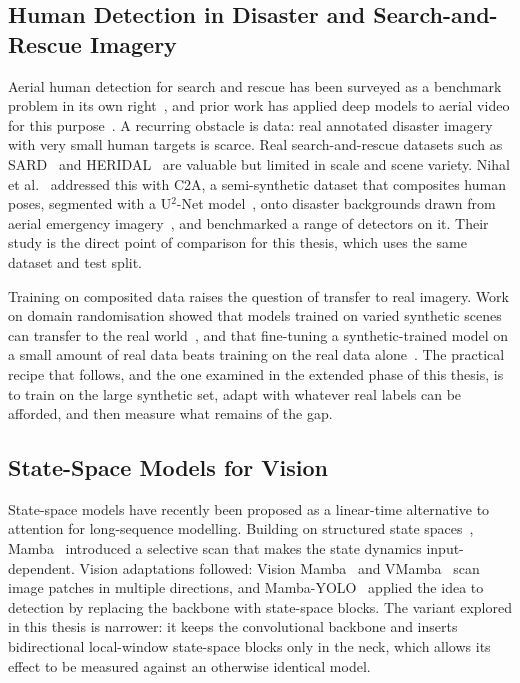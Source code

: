 \subsection{Human Detection in Disaster and Search-and-Rescue Imagery}
Aerial human detection for search and rescue has been surveyed as a benchmark
problem in its own right~\cite{sar_survey}, and prior work has applied deep models
to aerial video for this purpose~\cite{aerial_human_video}. A recurring obstacle is
data: real annotated disaster imagery with very small human targets is scarce. Real
search-and-rescue datasets such as SARD~\cite{sambolek2021sard} and
HERIDAL~\cite{bozic2019heridal} are valuable but limited in scale and scene variety.
Nihal et al.~\cite{nihal2024c2a} addressed this with C2A, a semi-synthetic dataset
that composites human poses, segmented with a U$^2$-Net model~\cite{qin2020u2net},
onto disaster backgrounds drawn from aerial emergency
imagery~\cite{kyrkou2020aider}, and benchmarked a range of detectors on it. Their
study is the direct point of comparison for this thesis, which uses the same dataset
and test split.

Training on composited data raises the question of transfer to real imagery.
Work on domain randomisation showed that models trained on varied synthetic
scenes can transfer to the real world~\cite{tobin2017domainrand}, and that
fine-tuning a synthetic-trained model on a small amount of real data beats
training on the real data alone~\cite{tremblay2018synthetic}. The practical
recipe that follows, and the one examined in the extended phase of this
thesis, is to train on the large synthetic set, adapt with whatever real
labels can be afforded, and then measure what remains of the gap.

\subsection{State-Space Models for Vision}
State-space models have recently been proposed as a linear-time alternative to
attention for long-sequence modelling. Building on structured state
spaces~\cite{gu2022s4}, Mamba~\cite{gu2023mamba} introduced a selective scan that
makes the state dynamics input-dependent. Vision adaptations followed: Vision
Mamba~\cite{zhu2024visionmamba} and VMamba~\cite{liu2024vmamba} scan image patches in
multiple directions, and Mamba-YOLO~\cite{wang2025mambayolo} applied the idea to
detection by replacing the backbone with state-space blocks. The variant explored in
this thesis is narrower: it keeps
the convolutional backbone and inserts bidirectional local-window state-space
blocks only in the neck, which allows its effect to be measured against an
otherwise identical model.


